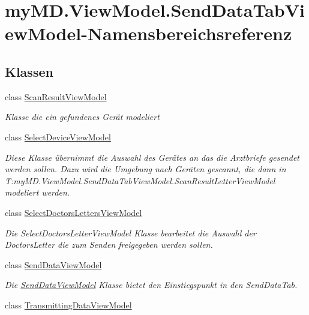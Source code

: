 \hypertarget{namespacemy_m_d_1_1_view_model_1_1_send_data_tab_view_model}{}\section{my\+M\+D.\+View\+Model.\+Send\+Data\+Tab\+View\+Model-\/\+Namensbereichsreferenz}
\label{namespacemy_m_d_1_1_view_model_1_1_send_data_tab_view_model}
\subsection*{Klassen}
\begin{DoxyCompactItemize}
\item 
class \mbox{\hyperlink{classmy_m_d_1_1_view_model_1_1_send_data_tab_view_model_1_1_scan_result_view_model}{Scan\+Result\+View\+Model}}
\begin{DoxyCompactList}\small\item\em Klasse die ein gefundenes Gerät modeliert \end{DoxyCompactList}\item 
class \mbox{\hyperlink{classmy_m_d_1_1_view_model_1_1_send_data_tab_view_model_1_1_select_device_view_model}{Select\+Device\+View\+Model}}
\begin{DoxyCompactList}\small\item\em Diese Klasse übernimmt die Auswahl des Gerätes an das die Arztbriefe gesendet werden sollen. Dazu wird die Umgebung nach Geräten gescannt, die dann in T\+:my\+M\+D.\+View\+Model.\+Send\+Data\+Tab\+View\+Model.\+Scan\+Result\+Letter\+View\+Model modeliert werden. \end{DoxyCompactList}\item 
class \mbox{\hyperlink{classmy_m_d_1_1_view_model_1_1_send_data_tab_view_model_1_1_select_doctors_letters_view_model}{Select\+Doctors\+Letters\+View\+Model}}
\begin{DoxyCompactList}\small\item\em Die Select\+Doctors\+Letter\+View\+Model Klasse bearbeitet die Auswahl der Doctors\+Letter die zum Senden freigegeben werden sollen. \end{DoxyCompactList}\item 
class \mbox{\hyperlink{classmy_m_d_1_1_view_model_1_1_send_data_tab_view_model_1_1_send_data_view_model}{Send\+Data\+View\+Model}}
\begin{DoxyCompactList}\small\item\em Die \mbox{\hyperlink{classmy_m_d_1_1_view_model_1_1_send_data_tab_view_model_1_1_send_data_view_model}{Send\+Data\+View\+Model}} Klasse bietet den Einstiegspunkt in den Send\+Data\+Tab. \end{DoxyCompactList}\item 
class \mbox{\hyperlink{classmy_m_d_1_1_view_model_1_1_send_data_tab_view_model_1_1_transmitting_data_view_model}{Transmitting\+Data\+View\+Model}}
\end{DoxyCompactItemize}
